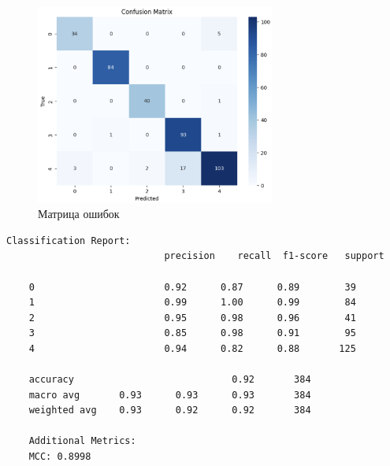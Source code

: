 \begin{figure}
	\begin{center}
		\includegraphics[width=0.7\textwidth]{images/13.png}
	\end{center}
	\caption{Матрица ошибок}
	\label{img:13}
\end{figure}

\begin{lstlisting}[label=lst:4,caption=Отчёт по результатам классификации]
	Classification Report:
							precision    recall  f1-score   support
	
	0       				0.92      0.87      0.89        39
	1       				0.99      1.00      0.99        84
	2       				0.95      0.98      0.96        41
	3       				0.85      0.98      0.91        95
	4       				0.94      0.82      0.88       125
	
	accuracy                            0.92       384
	macro avg       0.93      0.93      0.93       384
	weighted avg    0.93      0.92      0.92       384
	
	Additional Metrics:
	MCC: 0.8998
\end{lstlisting}

\clearpage
